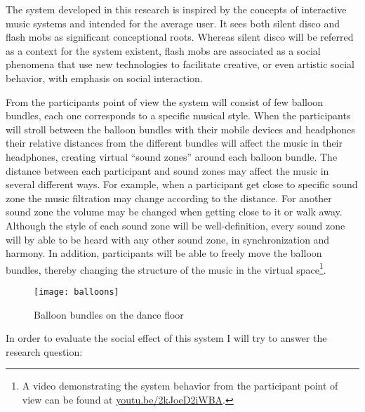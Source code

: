 
The system developed in this research is inspired by the concepts of interactive music systems and intended for the average user.
It sees both silent disco and flash mobs as significant conceptional roots.
Whereas silent disco will be referred as a context for the system existent, flash mobs are associated as a social phenomena that use new technologies to facilitate creative, or even artistic social behavior, with emphasis on social interaction.

From the participants point of view the system will consist of few balloon bundles, each one corresponds to a specific musical style.
When the participants will stroll between the balloon bundles with their mobile devices and headphones their relative distances from the different bundles will affect the music in their headphones, creating virtual ``sound zones'' around each balloon bundle.
The distance between each participant and sound zones may affect the music in several different ways.
For example, when a participant get close to specific sound zone the music filtration may change according to the distance.
For another sound zone the volume may be changed when getting close to it or walk away.
Although the style of each sound zone will be well-definition, every sound zone will by able to be heard with any other sound zone, in synchronization and harmony.
In addition, participants will be able to freely move the balloon bundles, thereby changing the structure of the music in the virtual space\footnote{A video demonstrating the system behavior from the participant point of view can be found at \href{http://youtu.be/2kJoeD2iWBA}{youtu.be/2kJoeD2iWBA}.}.

\begin{figure}[h]
	\texttt{[image: balloons]}
	\caption{Balloon bundles on the dance floor}
\end{figure}

In order to evaluate the social effect of this system I will try to answer the research question: \emph{\reserchquestion}
